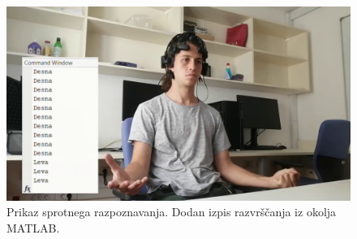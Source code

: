 \begin{figure}
    \begin{center}
    \includegraphics[width=1\linewidth]{slike/razpoznavanje.png}
    \end{center}
    \caption{Prikaz sprotnega razpoznavanja. Dodan izpis razvrščanja iz okolja MATLAB.}
    \end{figure}



